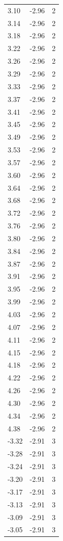 \begin{longtable}{lrr}
  3.10 & -2.96 & 2 \\
  3.14 & -2.96 & 2 \\
  3.18 & -2.96 & 2 \\
  3.22 & -2.96 & 2 \\
  3.26 & -2.96 & 2 \\
  3.29 & -2.96 & 2 \\
  3.33 & -2.96 & 2 \\
  3.37 & -2.96 & 2 \\
  3.41 & -2.96 & 2 \\
  3.45 & -2.96 & 2 \\
  3.49 & -2.96 & 2 \\
  3.53 & -2.96 & 2 \\
  3.57 & -2.96 & 2 \\
  3.60 & -2.96 & 2 \\
  3.64 & -2.96 & 2 \\
  3.68 & -2.96 & 2 \\
  3.72 & -2.96 & 2 \\
  3.76 & -2.96 & 2 \\
  3.80 & -2.96 & 2 \\
  3.84 & -2.96 & 2 \\
  3.87 & -2.96 & 2 \\
  3.91 & -2.96 & 2 \\
  3.95 & -2.96 & 2 \\
  3.99 & -2.96 & 2 \\
  4.03 & -2.96 & 2 \\
  4.07 & -2.96 & 2 \\
  4.11 & -2.96 & 2 \\
  4.15 & -2.96 & 2 \\
  4.18 & -2.96 & 2 \\
  4.22 & -2.96 & 2 \\
  4.26 & -2.96 & 2 \\
  4.30 & -2.96 & 2 \\
  4.34 & -2.96 & 2 \\
  4.38 & -2.96 & 2 \\
  -3.32 & -2.91 & 3 \\
  -3.28 & -2.91 & 3 \\
  -3.24 & -2.91 & 3 \\
  -3.20 & -2.91 & 3 \\
  -3.17 & -2.91 & 3 \\
  -3.13 & -2.91 & 3 \\
  -3.09 & -2.91 & 3 \\
  -3.05 & -2.91 & 3 \\

\end{longtable}
